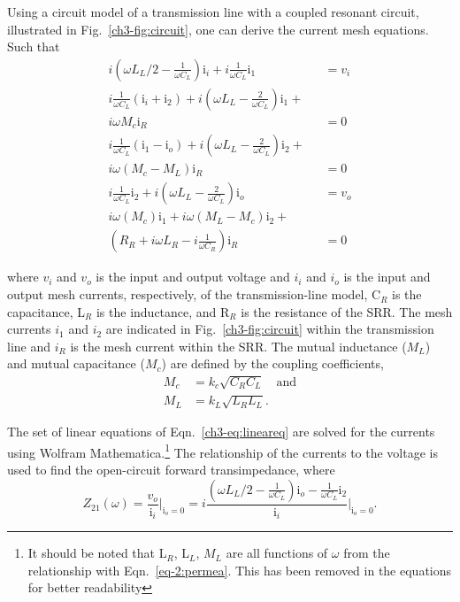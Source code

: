 Using a circuit model of a transmission line with a coupled resonant circuit, illustrated in Fig.~\ref{ch3-fig:circuit}, one can derive the current mesh equations. Such that
\begin{subequations}
\begin{eqnarray}
i(\omega L_L/2 - \frac{1}{\omega C_L}) \text{i}_i +  i\frac{1}{\omega C_L} \text{i}_1 &= v_i  \\
i\frac{1}{\omega C_L} (\text{i}_{i}+\text{i}_2) + i(\omega L_L - \frac{2}{\omega C_L}) \text{i}_{1} + \nonumber \\
 i \omega M_c \text{i}_R &= 0  \\
i\frac{1}{\omega C_L} (\text{i}_{1}-\text{i}_{o}) + i(\omega L_L - \frac{2}{\omega C_L}) \text{i}_{2} + \nonumber \\
i \omega (M_c - M_L) \text{i}_R &= 0  \\
i \frac{1}{\omega C_L} \text{i}_{2} + i(\omega L_L - \frac{2}{\omega C_L}) \text{i}_{o}  &= v_o  \\
i \omega (M_c) \text{i}_{1} + i \omega (M_L - M_c)\text{i}_2 + \qquad \nonumber \\ 
(R_R + i \omega L_R - i\frac{1}{\omega C_R}) \text{i}_R  &= 0
\end{eqnarray}\label{ch3-eq:lineareq}
\end{subequations}

\noindent 
where $v_i$ and $v_o$ is the input and output voltage and $i_i$ and $i_o$ is the input and output mesh currents, respectively, of the transmission-line model, C$_R$ is the capacitance, L$_R$ is the inductance, and R$_R$ is the resistance of the SRR. The mesh currents $i_1$ and $i_2$ are indicated in Fig.~\ref{ch3-fig:circuit} within the transmission line and $i_R$ is the mesh current within the SRR. The mutual inductance ($M_L$) and mutual capacitance ($M_c$) are defined by the coupling coefficients, 
\begin{subequations}
\begin{eqnarray}
    M_c &= k_c \sqrt{C_R C_L}\quad \text{and} \\
    M_L &= k_L \sqrt{L_R L_L}.
\end{eqnarray}
\end{subequations}

The set of linear equations of Eqn.~\ref{ch3-eq:lineareq} are solved for the currents using Wolfram Mathematica.\footnote{It should be noted that L$_R$, L$_L$, $M_L$ are all functions of $\omega$ from the relationship with Eqn.~\ref{eq-2:permea}. This has been removed in the equations for better readability} The relationship of the currents to the voltage is used to find the open-circuit forward transimpedance, where
\begin{equation}
    Z_{21}(\omega) = \frac{v_o}{\text{i}_i} \Biggr\rvert_{\text{i}_o=0} =i \frac{(\omega L_L/2 - \frac{1}{\omega C_L}) \text{i}_o - \frac{1}{\omega C_L} \text{i}_2  }{\text{i}_i} \Biggr\rvert_{\text{i}_o=0}.
\end{equation}


